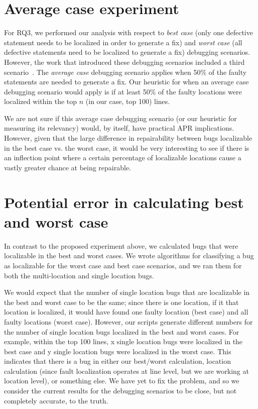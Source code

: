 \documentclass[10pt,journal,compsoc]{IEEEtran}
\begin{document}
\section*{Average case experiment}

For RQ3, we performed our analysis with respect to \textit{best case} 
(only one defective statement needs to be localized in order to generate a fix) 
and \textit{worst case} (all defective statements need to be localized to generate a fix) debugging scenarios.
However, the work that introduced these debugging scenarios included a third scenario~\cite{pearson2017evaluating}.
The \textit{average case} debugging scenario applies when 50\% of the faulty statements are needed to generate a fix.
Our heuristic for when an average case debugging scenario would apply is if at least 50\% of the faulty locations were 
localized within the top $n$ (in our case, top 100) lines.

We are not sure if this average case debugging scenario (or our heuristic for measuring its relevancy) 
would, by itself, have practical APR implications. 
However, given that the large difference in repairability between bugs localizable in the best case vs. the worst case,
it would be very interesting to see if there is an inflection point where a certain percentage of localizable locations 
cause a vastly greater chance at being repairable.

\section*{Potential error in calculating best and worst case}

In contrast to the proposed experiment above, we calculated bugs that were localizable in the best and worst cases.
We wrote algorithms for classifying a bug as localizable for the worst case and best case scenarios, 
and we ran them for both the multi-location and single location bugs.

We would expect that the number of single location bugs that are localizable in the best and worst case to be the same;
since there is one location, if it that location is localized, it would have found 
one faulty location (best case) and all faulty locations (worst case).
However, our scripts generate different numbers for the number of single location bugs localized in the best and worst cases.
For example, within the top 100 lines, 
x single location bugs were localized in the best case and y single location bugs were localized in the worst case.
This indicates that there is a bug in either our best/worst calculation, 
location calculation (since fault localization operates at line level, but we are working at location level),
or something else.
We have yet to fix the problem, and so we consider the current results for the debugging scenarios to be close, 
but not completely accurate, to the truth.
\end{document}
